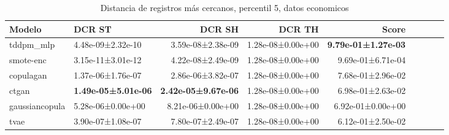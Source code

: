 \begin{table}[H]
\centering
\fontsize{10}{14}\selectfont
\caption{Distancia de registros más cercanos, percentil 5, datos economicos}
\label{table-dcr-economicos-a-5th}
\begin{tabular}{|l|l|r|r|r|r|r|r|r|}
\hline
\rowcolor[gray]{0.8}
Modelo & DCR ST & DCR SH & DCR TH & \textbf{Score} \\
\hline tddpm\_mlp & 4.48e-09±2.32e-10 & \cellcolor[rgb]{0.9, 0.54, 0.52} 3.59e-08±2.38e-09 & 1.28e-08±0.00e+00 & \bfseries 9.79e-01±1.27e-03 \\
\hline smote-enc & \cellcolor[rgb]{0.9, 0.54, 0.52} 3.15e-11±3.01e-12 & 4.22e-08±2.49e-09 & 1.28e-08±0.00e+00 & 9.69e-01±6.71e-04 \\
\hline copulagan & 1.37e-06±1.76e-07 & 2.86e-06±3.82e-07 & 1.28e-08±0.00e+00 & 7.68e-01±2.96e-02 \\
\hline ctgan & \bfseries 1.49e-05±5.01e-06 & \bfseries 2.42e-05±9.67e-06 & 1.28e-08±0.00e+00 & 6.98e-01±2.63e-02 \\
\hline gaussiancopula & 5.28e-06±0.00e+00 & 8.21e-06±0.00e+00 & 1.28e-08±0.00e+00 & 6.92e-01±0.00e+00 \\
\hline tvae & 3.90e-07±1.08e-07 & 7.80e-07±2.49e-07 & 1.28e-08±0.00e+00 & \cellcolor[rgb]{0.9, 0.54, 0.52} 6.12e-01±2.50e-02 \\
\hline
\end{tabular}
\end{table}
